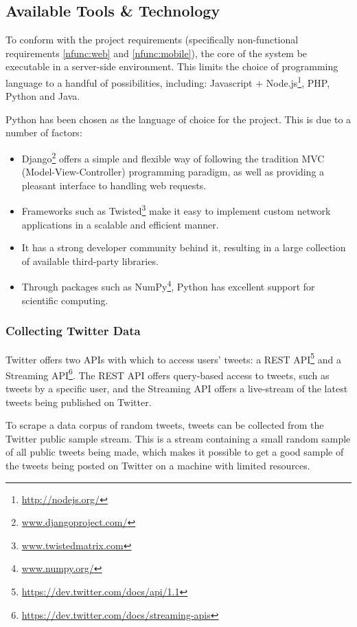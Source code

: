\documentclass[12pt,a4paper]{article}
\begin{document}
\subsection{Available Tools \& Technology}

To conform with the project requirements (specifically non-functional requirements \ref{nfunc:web} and \ref{nfunc:mobile}), the core of the system be executable in a server-side environment. This limits the choice of programming language to a handful of possibilities, including: Javascript + Node.js\footnote{\url{http://nodejs.org/}}, PHP, Python and Java.

Python has been chosen as the language of choice for the project. This is due to a number of factors:
\begin{itemize}
    \item Django\footnote{\url{www.djangoproject.com/}} offers a simple and flexible way of following the tradition MVC (Model-View-Controller) programming paradigm, as well as providing a pleasant interface to handling web requests.
    \item Frameworks such as Twisted\footnote{\url{www.twistedmatrix.com}} make it easy to implement custom network applications in a scalable and efficient manner.
    \item It has a strong developer community behind it, resulting in a large collection of available third-party libraries.
    \item Through packages such as NumPy\footnote{\url{www.numpy.org/}}, Python has excellent support for scientific computing.
\end{itemize}
        
\subsubsection{Collecting Twitter Data}
Twitter offers two APIs with which to access users' tweets: a REST API\footnote{\url{https://dev.twitter.com/docs/api/1.1}} and a Streaming API\footnote{\url{https://dev.twitter.com/docs/streaming-apis}}. The REST API offers query-based access to tweets, such as tweets by a specific user, and the Streaming API offers a live-stream of the latest tweets being published on Twitter.

To scrape a data corpus of random tweets, tweets can be collected from the Twitter public sample stream. This is a stream containing a small random sample of all public tweets being made, which makes it possible to get a good sample of the tweets being posted on Twitter on a machine with limited resources.
\end{document}
